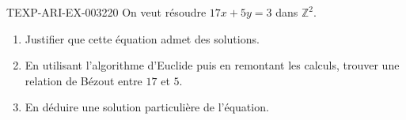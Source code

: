 \begin{exercice}{TEXP-ARI-EX-003}{2}{20}
On veut résoudre $17x+5y=3$ dans $\mathbb{Z}^2$.
\begin{enumerate}
  \item Justifier que cette équation admet des solutions.
  \item En utilisant l'algorithme d'Euclide puis en remontant les calculs, trouver une relation de Bézout entre $17$ et $5$.
  \item En déduire une solution particulière de l'équation.
\end{enumerate}
\end{exercice}

